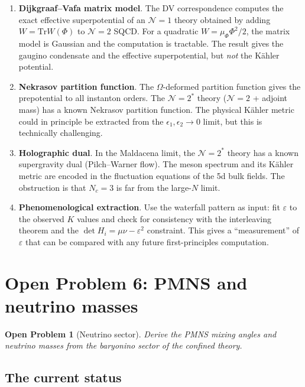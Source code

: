 \documentclass[12pt,a4paper]{article}
\newcommand{\Tr}{\mathrm{Tr}}
\newtheorem{problem}{Open Problem}
\begin{document}
\begin{enumerate}[label=(\alph*)]
\item \textbf{Dijkgraaf--Vafa matrix model}.  The DV correspondence
  computes the exact effective superpotential of an
  $\mathcal{N}{=}1$ theory obtained by adding $W = \Tr W(\Phi)$
  to $\mathcal{N}{=}2$ SQCD.  For a quadratic $W = \mu_\Phi \Phi^2/2$,
  the matrix model is Gaussian and the computation is tractable.
  The result gives the gaugino condensate and the effective
  superpotential, but \emph{not} the K\"ahler potential.

\item \textbf{Nekrasov partition function}.  The $\Omega$-deformed
  partition function gives the prepotential to all instanton orders.
  The $\mathcal{N}{=}2^*$ theory ($\mathcal{N}{=}2$ + adjoint mass)
  has a known Nekrasov partition function.  The physical K\"ahler
  metric could in principle be extracted from the $\epsilon_1, \epsilon_2
  \to 0$ limit, but this is technically challenging.

\item \textbf{Holographic dual}.  In the Maldacena limit, the
  $\mathcal{N}{=}2^*$ theory has a known supergravity dual
  (Pilch--Warner flow).  The meson spectrum and its K\"ahler metric
  are encoded in the fluctuation equations of the 5d bulk fields.
  The obstruction is that $N_c = 3$ is far from the large-$N$ limit.

\item \textbf{Phenomenological extraction}.  Use the waterfall pattern
  as input: fit $\varepsilon$ to the observed $K$ values and check
  for consistency with the interleaving theorem and the
  $\det H_i = \mu\nu - \varepsilon^2$ constraint.  This gives a
  ``measurement'' of $\varepsilon$ that can be compared with any
  future first-principles computation.
\end{enumerate}


\section{Open Problem 6: PMNS and neutrino masses}
\label{sec:pmns}

\begin{problem}[Neutrino sector]
Derive the PMNS mixing angles and neutrino masses from the baryonino
sector of the confined theory.
\end{problem}

\subsection{The current status}
\end{document}
